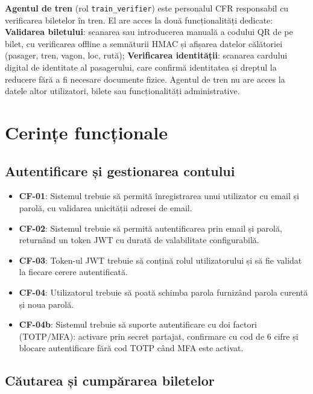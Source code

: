 \documentclass[12pt,a4paper]{report}
\begin{document}
\textbf{Agentul de tren} (rol \texttt{train\_verifier}) este personalul CFR responsabil cu verificarea biletelor în tren. El are acces la două funcționalități dedicate: \textbf{Validarea biletului}: scanarea sau introducerea manuală a codului QR de pe bilet, cu verificarea offline a semnăturii HMAC și afișarea datelor călătoriei (pasager, tren, vagon, loc, rută); \textbf{Verificarea identității}: scanarea cardului digital de identitate al pasagerului, care confirmă identitatea și dreptul la reducere fără a fi necesare documente fizice. Agentul de tren nu are acces la datele altor utilizatori, bilete sau funcționalități administrative.


\section{Cerințe funcționale}

\subsection{Autentificare și gestionarea contului}

\begin{itemize}
  \item \textbf{CF-01}: Sistemul trebuie să permită înregistrarea unui utilizator cu email și parolă, cu validarea unicității adresei de email.
  \item \textbf{CF-02}: Sistemul trebuie să permită autentificarea prin email și parolă, returnând un token JWT cu durată de valabilitate configurabilă.
  \item \textbf{CF-03}: Token-ul JWT trebuie să conțină rolul utilizatorului și să fie validat la fiecare cerere autentificată.
  \item \textbf{CF-04}: Utilizatorul trebuie să poată schimba parola furnizând parola curentă și noua parolă.
  \item \textbf{CF-04b}: Sistemul trebuie să suporte autentificare cu doi factori (TOTP/MFA): activare prin secret partajat, confirmare cu cod de 6 cifre și blocare autentificare fără cod TOTP când MFA este activat.
\end{itemize}

\subsection{Căutarea și cumpărarea biletelor}
\end{document}
